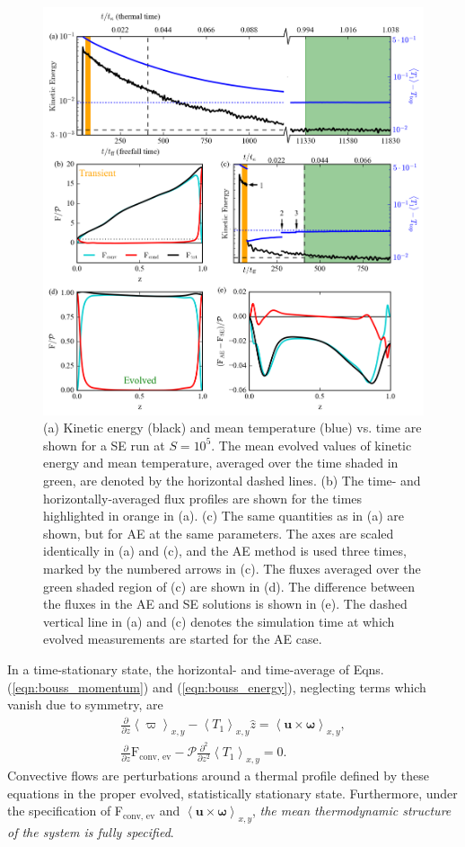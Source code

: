 \documentclass[aps, pre, onecolumn, nofootinbib, notitlepage, groupedaddress, amsfonts, amssymb, amsmath, longbibliography]{revtex4-1}
\newcommand{\angles}[1]{\ensuremath{\left\langle #1 \right\rangle}}
\begin{document}
\begin{figure}[t!]
\includegraphics[width=\textwidth]{./figs/time_trace.png}
\caption{(a) Kinetic energy (black) and mean temperature (blue)  vs. time are shown
for a SE run at $S = 10^5$. The mean evolved values of kinetic energy and mean temperature,
averaged over the time shaded in green,
are denoted by the horizontal dashed lines. (b) The time- and horizontally-averaged
flux profiles are shown for the times highlighted in orange in (a).
(c) The same quantities as in (a) are shown, but for AE at the same parameters.
The axes are scaled identically in (a) and (c), and the AE method is used three times, marked by
the numbered arrows in (c). The fluxes averaged over the green shaded region of (c)
are shown in (d). The difference between
the fluxes in the AE and SE solutions is shown in (e). The dashed
vertical line in (a) and (c) denotes the simulation time at which evolved measurements
are started for the AE case.
\label{fig:time_trace} }
\end{figure}

In a time-stationary state, the horizontal- and time-average of
Eqns. (\ref{eqn:bouss_momentum}) and (\ref{eqn:bouss_energy}), neglecting terms which
vanish due to symmetry, are
\begin{gather}
\frac{\partial}{\partial z}\angles{\varpi}_{x,y} - \angles{T_1}_{x,y}\hat{z} = \angles{\bm{u}\times\bm{\omega}}_{x,y},
	\label{eqn:bouss_BVP_momentum}
\\
\frac{\partial}{\partial z}\text{F}_{\text{conv, ev}} - \mathcal{P}\frac{\partial^2}{\partial z^2} \angles{T_1}_{x,y} = 0.
	\label{eqn:bouss_BVP_energy}
\end{gather}
Convective flows
are perturbations around a thermal profile defined by these equations in the proper evolved, 
statistically stationary state. Furthermore, under the specification of
F$_{\text{conv, ev}}$ and $\angles{\bm{u}\times\bm{\omega}}_{x,y}$,
\emph{the mean thermodynamic structure of the system is fully specified}.
\end{document}
